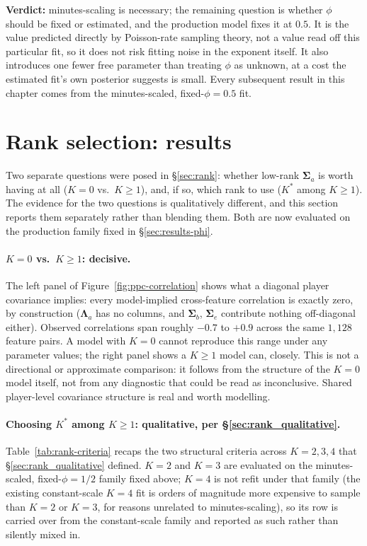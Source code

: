 \textbf{Verdict:} minutes-scaling is necessary; the remaining question is whether $\phi$ should be fixed or
estimated, and the production model fixes it at $0.5$. It is the value predicted directly by Poisson-rate sampling theory, not a value read off this
particular fit, so it does not risk fitting noise in the exponent itself. It also introduces one fewer free
parameter than treating $\phi$ as unknown, at a cost the estimated fit's own posterior suggests is small.
Every subsequent result in this chapter comes from the minutes-scaled, fixed-$\phi=0.5$ fit.

\FloatBarrier

\section{Rank selection: results}
\label{sec:results-rank}

Two separate questions were posed in \S\ref{sec:rank}: whether low-rank $\boldsymbol\Sigma_a$ is worth having
at all ($K=0$ vs.\ $K\geq1$), and, if so, which rank to use ($K^*$ among $K\geq1$). The evidence for the two
questions is qualitatively different, and this section reports them separately rather than blending them. Both
are now evaluated on the production family fixed in \S\ref{sec:results-phi}.

\paragraph{$K=0$ vs.\ $K\geq1$: decisive.} The left panel of Figure~\ref{fig:ppc-correlation} shows what a
diagonal player covariance implies: every model-implied cross-feature correlation is exactly zero, by
construction ($\boldsymbol\Lambda_a$ has no columns, and $\boldsymbol\Sigma_b$, $\boldsymbol\Sigma_e$
contribute nothing off-diagonal either). Observed correlations span roughly $-0.7$ to $+0.9$ across the same
$1{,}128$ feature pairs. A model with $K=0$ cannot reproduce this range under any parameter values; the right
panel shows a $K\geq1$ model can, closely. This is not a directional or approximate comparison: it follows
from the structure of the $K=0$ model itself, not from any diagnostic that could be read as inconclusive.
Shared player-level covariance structure is real and worth modelling.

\paragraph{Choosing $K^*$ among $K \geq 1$: qualitative, per \S\ref{sec:rank_qualitative}.} Table~\ref{tab:rank-criteria}
recaps the two structural criteria across $K=2,3,4$ that \S\ref{sec:rank_qualitative} defined. $K=2$ and $K=3$
are evaluated on the minutes-scaled, fixed-$\phi=1/2$ family fixed above; $K=4$
is not refit under that family (the existing constant-scale $K=4$ fit is orders of magnitude more expensive to
sample than $K=2$ or $K=3$, for reasons unrelated to minutes-scaling), so its row is carried over from the
constant-scale family and reported as such rather than silently mixed in.


